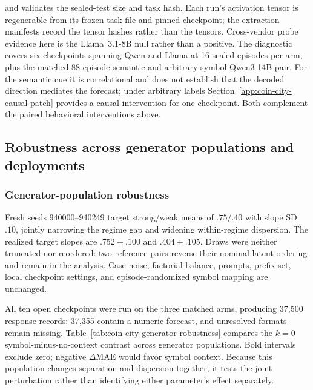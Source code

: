and validates the sealed-test size and task hash. Each run's
activation tensor is regenerable from its frozen task file and pinned checkpoint;
the extraction manifests record the tensor hashes rather than the tensors.
Cross-vendor probe evidence here is the Llama~3.1-8B null rather than a
positive. The diagnostic covers six checkpoints spanning Qwen and Llama at 16 sealed episodes per arm, plus
the matched 88-episode semantic and arbitrary-symbol Qwen3-14B pair. For the semantic
cue it is correlational and does not establish that the decoded direction
mediates the forecast; under arbitrary labels
Section~\ref{app:coin-city-causal-patch} provides a causal intervention for one
checkpoint. Both complement the paired behavioral interventions above.

\subsection{Robustness across generator populations and deployments}
\label{app:coin-city-robustness}

\subsubsection{Generator-population robustness}
Fresh seeds 940000--940249 target strong/weak means of \(.75/.40\)
with slope SD \(.10\), jointly narrowing the regime gap and widening
within-regime dispersion. The realized target slopes are
\(.752\pm.100\) and \(.404\pm.105\). Draws were neither truncated nor reordered:
two reference pairs reverse their nominal latent ordering and remain in the
analysis. Case noise, factorial balance, prompts, prefix set, local checkpoint
settings, and episode-randomized symbol mapping are unchanged.

All ten open checkpoints were run on the three matched arms, producing 37,500
response records; 37,355 contain a numeric forecast, and unresolved formats remain
missing. Table~\ref{tab:coin-city-generator-robustness} compares the
\(k=0\) symbol-minus-no-context contrast across generator populations. Bold
intervals exclude zero; negative \(\Delta\)MAE would favor symbol context.
Because this population changes separation and dispersion together, it tests the
joint perturbation rather than identifying either parameter's effect separately.

